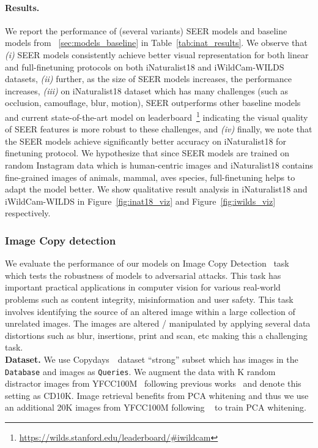 \documentclass[10pt,twocolumn,letterpaper]{article}
\newcommand{\inat}{iNaturalist18\xspace}
\newcommand{\iwild}{iWildCam-WILDS\xspace}
\newcommand{\copydays}{Copydays\xspace}
\begin{document}
\paragraph{Results.}
We report the performance of (several variants) SEER models and baseline models from ~\ref{sec:models_baseline} in Table~\ref{tab:inat_results}. We observe that \textit{(i)} SEER models consistently achieve better visual representation for both linear and full-finetuning protocols on both \inat and \iwild datasets, \textit{(ii)} further, as the size of SEER models increases, the performance increases, \textit{(iii)} on \inat dataset which has many challenges (such as occlusion, camouflage, blur, motion), SEER outperforms other baseline models and current state-of-the-art model on leaderboard~\footnote{\url{https://wilds.stanford.edu/leaderboard/\#iwildcam}} indicating the visual quality of SEER features is more robust to these challenges, and \textit{(iv)} finally, we note that the SEER models achieve significantly better accuracy  on \inat for finetuning protocol. We hypothesize that since SEER models are trained on random Instagram data which is human-centric images and \inat contains fine-grained images of animals, mammal, aves species, full-finetuning helps to adapt the model better. We show qualitative result analysis in \inat and \iwild in Figure~\ref{fig:inat18_viz} and Figure~\ref{fig:iwilds_viz} respectively.


\subsubsection{Image Copy detection}
\label{sec:copy_detection_results}

We evaluate the performance of our models on Image Copy Detection~\cite{copydays2009} task which tests the robustness of models to adversarial attacks. This task has important practical applications in computer vision for various real-world problems such as content integrity, misinformation and user safety. This task involves identifying the source of an altered image within a large collection of unrelated images. The images are altered / manipulated by applying several data distortions such as blur, insertions, print and scan, etc making this a challenging task. \\

\noindent\textbf{Dataset.}
We use \copydays~\ dataset ``strong'' subset which has  images in the \texttt{Database} and  images as \texttt{Queries}. We augment the data with K random distractor images from YFCC100M~\cite{yfcc2016} following previous works~\cite{berman2019multigrain,caron2021emerging} and denote this setting as CD10K. Image retrieval benefits from PCA whitening and thus we use an additional 20K images from YFCC100M following ~\cite{caron2021emerging,berman2019multigrain} to train PCA whitening. \\
\end{document}
